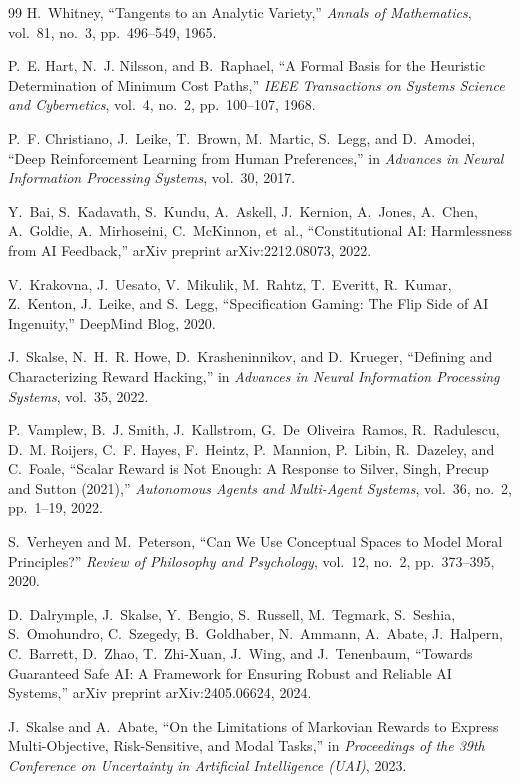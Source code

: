 \documentclass[12pt,letterpaper]{article}
\theoremstyle{definition}
\theoremstyle{remark}
\begin{document}
\begin{thebibliography}{99}
H.~Whitney, ``Tangents to an Analytic Variety,'' \emph{Annals of Mathematics}, vol.~81, no.~3, pp.~496--549, 1965.

P.~E. Hart, N.~J. Nilsson, and B.~Raphael, ``A Formal Basis for the Heuristic Determination of Minimum Cost Paths,'' \emph{IEEE Transactions on Systems Science and Cybernetics}, vol.~4, no.~2, pp.~100--107, 1968.

P.~F. Christiano, J.~Leike, T.~Brown, M.~Martic, S.~Legg, and D.~Amodei, ``Deep Reinforcement Learning from Human Preferences,'' in \emph{Advances in Neural Information Processing Systems}, vol.~30, 2017.

Y.~Bai, S.~Kadavath, S.~Kundu, A.~Askell, J.~Kernion, A.~Jones, A.~Chen, A.~Goldie, A.~Mirhoseini, C.~McKinnon, et~al., ``Constitutional AI: Harmlessness from AI Feedback,'' arXiv preprint arXiv:2212.08073, 2022.

V.~Krakovna, J.~Uesato, V.~Mikulik, M.~Rahtz, T.~Everitt, R.~Kumar, Z.~Kenton, J.~Leike, and S.~Legg, ``Specification Gaming: The Flip Side of AI Ingenuity,'' DeepMind Blog, 2020.

J.~Skalse, N.~H.~R. Howe, D.~Krasheninnikov, and D.~Krueger, ``Defining and Characterizing Reward Hacking,'' in \emph{Advances in Neural Information Processing Systems}, vol.~35, 2022.

P.~Vamplew, B.~J. Smith, J.~Kallstrom, G.~De~Oliveira~Ramos, R.~Radulescu, D.~M. Roijers, C.~F. Hayes, F.~Heintz, P.~Mannion, P.~Libin, R.~Dazeley, and C.~Foale, ``Scalar Reward is Not Enough: A Response to Silver, Singh, Precup and Sutton (2021),'' \emph{Autonomous Agents and Multi-Agent Systems}, vol.~36, no.~2, pp.~1--19, 2022.

S.~Verheyen and M.~Peterson, ``Can We Use Conceptual Spaces to Model Moral Principles?'' \emph{Review of Philosophy and Psychology}, vol.~12, no.~2, pp.~373--395, 2020.

D.~Dalrymple, J.~Skalse, Y.~Bengio, S.~Russell, M.~Tegmark, S.~Seshia, S.~Omohundro, C.~Szegedy, B.~Goldhaber, N.~Ammann, A.~Abate, J.~Halpern, C.~Barrett, D.~Zhao, T.~Zhi-Xuan, J.~Wing, and J.~Tenenbaum, ``Towards Guaranteed Safe AI: A Framework for Ensuring Robust and Reliable AI Systems,'' arXiv preprint arXiv:2405.06624, 2024.

J.~Skalse and A.~Abate, ``On the Limitations of Markovian Rewards to Express Multi-Objective, Risk-Sensitive, and Modal Tasks,'' in \emph{Proceedings of the 39th Conference on Uncertainty in Artificial Intelligence (UAI)}, 2023.

\end{thebibliography}
\end{document}
